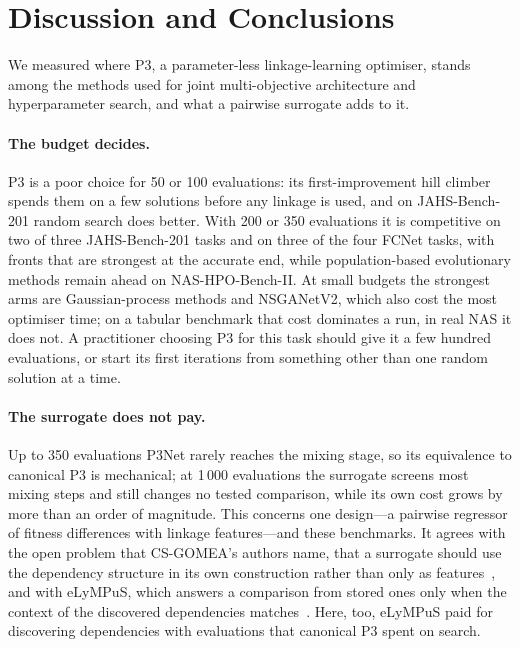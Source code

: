 \section{Discussion and Conclusions}
\label{sec:conclusions}

We measured where P3, a parameter-less linkage-learning optimiser, stands among the methods used for joint
multi-objective architecture and hyperparameter search, and what a pairwise surrogate adds to it.

\paragraph{The budget decides.} P3 is a poor choice for 50 or 100 evaluations: its first-improvement hill climber
spends them on a few solutions before any linkage is used, and on JAHS-Bench-201 random search does better. With 200
or 350 evaluations it is competitive on two of three JAHS-Bench-201 tasks and on three of the four FCNet tasks, with fronts that
are strongest at the accurate end, while population-based evolutionary methods remain ahead on NAS-HPO-Bench-II. At
small budgets the strongest arms are Gaussian-process methods and NSGANetV2, which also cost the most optimiser time;
on a tabular benchmark that cost dominates a run, in real NAS it does not. A practitioner choosing P3 for this task
should give it a few hundred evaluations, or start its first iterations from something other than one random solution
at a time.

\paragraph{The surrogate does not pay.} Up to 350 evaluations P3Net rarely reaches the mixing stage, so its equivalence
to canonical P3 is mechanical; at 1\,000 evaluations the surrogate screens most mixing steps and still changes no
tested comparison, while its own cost grows by more than an order of magnitude. This concerns one design---a pairwise
regressor of fitness differences with linkage features---and these benchmarks. It agrees with the open problem that
CS-GOMEA's authors name, that a surrogate should use the dependency structure in its own construction rather than
only as features~\citep{dushatskiy2019csgomea}, and with eLyMPuS, which answers a comparison from stored ones only when the
context of the discovered dependencies matches~\citep{przewozniczek2026lympus}. Here, too, eLyMPuS paid for discovering
dependencies with evaluations that canonical P3 spent on search.

